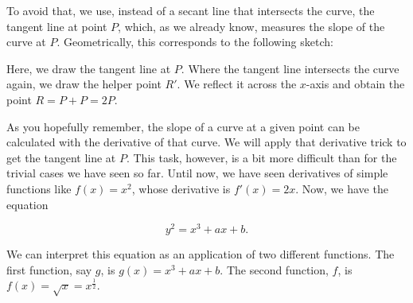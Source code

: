\documentclass[tikz]{scrreprt}
\begin{document}
To avoid that, we use, instead of a secant line
that intersects the curve, the tangent line at
point $P$, which, as we already know, measures 
the slope of the curve at $P$.
Geometrically, this corresponds to the following sketch:

\begin{center}
\end{center}

Here, we draw the tangent line at $P$.
Where the tangent line intersects the curve again,
we draw the helper point $R'$. We reflect it across
the $x$-axis and obtain the point $R = P+P = 2P$.

As you hopefully remember, the slope of a curve 
at a given point can be calculated with the derivative of that curve.
We will apply that derivative trick to get the tangent line
at $P$. This task, however, is a bit more difficult than
for the trivial cases we have seen so far.
Until now, we have seen derivatives of simple functions like
$f(x) = x^2$, whose derivative is $f'(x) = 2x$.
Now, we have the equation

\begin{equation}
y^2 = x^3 + ax + b.
\end{equation}

We can interpret this equation as an application of
two different functions. The first function, say $g$,
is $g(x) = x^3 + ax + b$. The second function, $f$, is
$f(x) = \sqrt{x} = x^{\frac{1}{2}}$.
\end{document}
